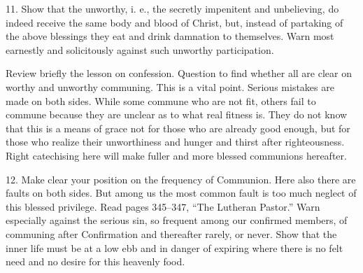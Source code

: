 11. Show that the unworthy, i. e., the secretly impenitent and unbelieving, do indeed receive the same body and blood of Christ, but, instead of partaking of the above blessings they eat and drink damnation to themselves. 
Warn most earnestly and solicitously against such unworthy participation.

Review briefly the lesson on confession. Question to find whether all are clear on worthy and unworthy communing. This is a vital point. Serious mistakes are made on both sides. While some commune who are not fit, others fail to commune because they are unclear as to what real fitness is. They do not know that this is a means of grace not for those who are already good enough, but for those who realize their unworthiness and hunger and thirst after righteousness. Right catechising here will make fuller and more blessed communions hereafter.

12. Make clear your position on the frequency of Communion. Here also there are faults on both sides. But among us the most common fault is too much neglect of this blessed privilege. Read pages 345–347, “The Lutheran Pastor.” Warn especially against the serious sin, so frequent among our confirmed members, of communing after Confirmation and thereafter rarely, or never. Show that the inner life must be at a low ebb and in danger of expiring where there is no felt need and no desire for this heavenly food. 
